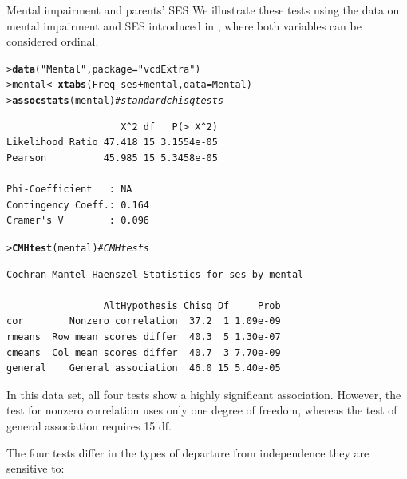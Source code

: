 \documentclass[10pt,krantz2]{krantz}\usepackage[]{graphicx}\usepackage[]{color}
\makeatletter
\newcommand{\hlstr}[1]{\textcolor[rgb]{0.192,0.494,0.8}{#1}}%
\newcommand{\hlcom}[1]{\textcolor[rgb]{0.678,0.584,0.686}{\textit{#1}}}%
\newcommand{\hlopt}[1]{\textcolor[rgb]{0,0,0}{#1}}%
\newcommand{\hlstd}[1]{\textcolor[rgb]{0.345,0.345,0.345}{#1}}%
\newcommand{\hlkwb}[1]{\textcolor[rgb]{0.69,0.353,0.396}{#1}}%
\newcommand{\hlkwc}[1]{\textcolor[rgb]{0.333,0.667,0.333}{#1}}%
\newcommand{\hlkwd}[1]{\textcolor[rgb]{0.737,0.353,0.396}{\textbf{#1}}}%
\newenvironment{kframe}{%
 \def\at@end@of@kframe{}%
 \ifinner\ifhmode%
  \def\at@end@of@kframe{\end{minipage}}%
  \begin{minipage}{\columnwidth}%
 \fi\fi%
 \def\FrameCommand##1{\hskip\@totalleftmargin \hskip-\fboxsep
 \colorbox{shadecolor}{##1}\hskip-\fboxsep
     \hskip-\linewidth \hskip-\@totalleftmargin \hskip\columnwidth}%
 \MakeFramed {\advance\hsize-\width
   \@totalleftmargin\z@ \linewidth\hsize
   \@setminipage}}%
 {\par\unskip\endMakeFramed%
 \at@end@of@kframe}
\newenvironment{knitrout}{}{} %
\renewenvironment{knitrout}{\small\renewcommand{\baselinestretch}{.85}}{} %
\makeatother
\begin{document}
\begin{Example}[mental2]{Mental impairment and parents' SES}
We illustrate these tests using the data on mental impairment and SES
introduced in , where both variables can be considered ordinal.
\begin{knitrout}
\color{fgcolor}\begin{kframe}
\begin{alltt}
\hlstd{> }\hlkwd{data}\hlstd{(}\hlstr{"Mental"}\hlstd{,} \hlkwc{package} \hlstd{=} \hlstr{"vcdExtra"}\hlstd{)}
\hlstd{> }\hlstd{mental} \hlkwb{<-} \hlkwd{xtabs}\hlstd{(Freq} \hlopt{~} \hlstd{ses} \hlopt{+} \hlstd{mental,} \hlkwc{data} \hlstd{= Mental)}
\hlstd{> }\hlkwd{assocstats}\hlstd{(mental)}    \hlcom{# standard chisq tests}
\end{alltt}
\begin{verbatim}
                    X^2 df   P(> X^2)
Likelihood Ratio 47.418 15 3.1554e-05
Pearson          45.985 15 5.3458e-05

Phi-Coefficient   : NA 
Contingency Coeff.: 0.164 
Cramer's V        : 0.096 
\end{verbatim}
\begin{alltt}
\hlstd{> }\hlkwd{CMHtest}\hlstd{(mental)}       \hlcom{# CMH tests}
\end{alltt}
\begin{verbatim}
Cochran-Mantel-Haenszel Statistics for ses by mental 

                 AltHypothesis Chisq Df     Prob
cor        Nonzero correlation  37.2  1 1.09e-09
rmeans  Row mean scores differ  40.3  5 1.30e-07
cmeans  Col mean scores differ  40.7  3 7.70e-09
general    General association  46.0 15 5.40e-05
\end{verbatim}
\end{kframe}
\end{knitrout}
In this data set, all four tests show a highly significant association.
However, the  test for nonzero correlation uses only one
degree of freedom, whereas the test of general association requires
15 df.
\end{Example}

The four tests differ in the types of departure from
independence they are sensitive to:
\end{document}
